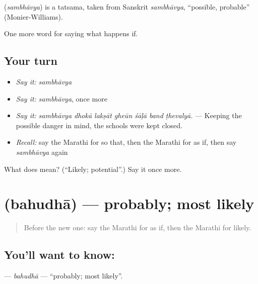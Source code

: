 \begin{cousinweb}
\textbf{} (\emph{sambhāvya}) is a tatsama, taken from Sanskrit \emph{sambhāvya}, \textquotedblleft{}possible, probable\textquotedblright{} (Monier-Williams).
\end{cousinweb}

\begin{grammarlens}[title={What you've built}]
One more word for saying what happens if.
\end{grammarlens}

\subsection*{Your turn}
\begin{itemize}
\raggedright
  \item \emph{Say it:} \emph{sambhāvya}
  \item \emph{Say it:} \emph{sambhāvya}, once more
  \item \emph{Say it:} \emph{sambhāvya dhokā lakṣāt gheūn śāḷā band ṭhevalyā.} — Keeping the possible danger in mind, the schools were kept closed.
  \item \emph{Recall:} say the Marathi for so that, then the Marathi for as if, then say \emph{sambhāvya} again
\end{itemize}

\begin{tcolorbox}[breakable,colback=teal!4,colframe=teal!35!black,title={Before you move on}]
What does  mean? (\textquotedblleft{}Likely; potential\textquotedblright{}.) Say it once more.
\end{tcolorbox}
\section[\texorpdfstring{\mr{बहुधा} (bahudhā)}{बहुधा (bahudhā)}]{ (bahudhā) — probably; most likely}

\label{lesson:MR-C382-bahudha}



\begin{quote}
Before the new one: say the Marathi for as if, then the Marathi for likely.
\end{quote}

\subsection*{You'll want to know: }
\textbf{} — \emph{bahudhā} — \textquotedblleft{}probably; most likely\textquotedblright{}.

